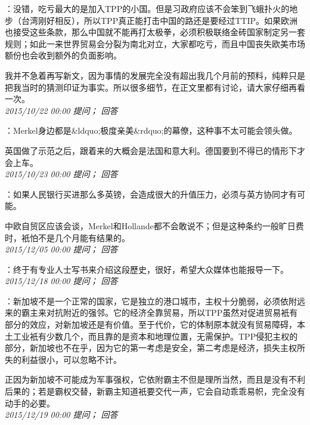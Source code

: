 \documentclass[twocolumn]{ctexart}
\begin{document}
：没错，吃亏最大的是加入TPP的小国。但是习政府应该不会笨到飞蛾扑火的地步（台湾刚好相反），所以TPP真正能打击中国的路还是要经过TTIP。如果欧洲也接受这些条款，那么中国就不能再打太极拳，必须积极联络金砖国家制定另一套规则；如此一来世界贸易会分裂为南北对立，大家都吃亏，而且中国丧失欧美市场额份也会收到额外的负面影响。

我并不急着再写新文，因为事情的发展完全没有超出我几个月前的预料，纯粹只是把我当时的猜测印证为事实。所以很多细节，在正文里都有讨论，请大家仔细再看一次。\\

\textit{\hfill\noindent\small 2015/10/22 00:00 提问； 回答}

：Merkel身边都是\&ldquo;极度亲美\&rdquo;的幕僚，这种事不太可能会领头做。

英国做了示范之后，跟着来的大概会是法国和意大利。德国要到不得已的情形下才会上车。\\

\textit{\hfill\noindent\small 2015/10/23 00:00 提问； 回答}

：如果人民银行买进那么多英镑，会造成很大的升值压力，必须与英方协同才有可能。

中欧自贸区应该会谈，Merkel和Hollande都不会敢说不；但是这种条约一般旷日费时，衹怕不是几个月能有结果的。\\

\textit{\hfill\noindent\small 2015/12/05 00:00 提问； 回答}

：终于有专业人士写书来介绍这段歷史，很好，希望大众媒体也能报导一下。\\

\textit{\hfill\noindent\small 2015/12/18 00:00 提问； 回答}

：新加坡不是一个正常的国家，它是独立的港口城市，主权十分脆弱，必须依附远来的霸主来对抗附近的强邻。它的经济全靠贸易，所以TPP虽然对促进贸易衹有部分的效应，对新加坡还是有价值。至于代价，它的体制原本就没有贸易障碍，本土工业衹有少数几个，而且靠的是资本和地理位置，无需保护。TPP侵犯主权的部分，新加坡也不在乎，因为它的第一考虑是安全，第二考虑是经济，损失主权所失的利益很小，可以忽略不计。

正因为新加坡不可能成为军事强权，它依附霸主不但是理所当然，而且是没有不利后果的；若是霸权交替，新霸主知道衹要交代一声，它会自动乖乖易帜，完全没有动手的必要。\\

\textit{\hfill\noindent\small 2015/12/19 00:00 提问； 回答}
\end{document}
